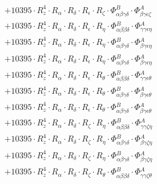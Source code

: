 \documentclass{article}
\begin{document}
\begin{subequations}
\begin{gather}
\begin{array}{c}
 \\[0.2em] 		 + 10395 \cdot R_{z}^{4} \cdot R_{\alpha{}} \cdot R_{\delta{}} \cdot R_{\epsilon{}} \cdot R_{\zeta{}} \cdot \Phi{}^{B}_{\alpha{}\beta{}\gamma{}\delta{}} \cdot \Phi{}^{A}_{\beta{}\gamma{}\epsilon{}\zeta{}} 
 \\[0.2em] 		 + 10395 \cdot R_{z}^{4} \cdot R_{\alpha{}} \cdot R_{\delta{}} \cdot R_{\epsilon{}} \cdot R_{\eta{}} \cdot \Phi{}^{B}_{\alpha{}\beta{}\beta{}\delta{}} \cdot \Phi{}^{A}_{\gamma{}\gamma{}\epsilon{}\eta{}} 
 \\[0.2em] 		 + 10395 \cdot R_{z}^{4} \cdot R_{\alpha{}} \cdot R_{\delta{}} \cdot R_{\epsilon{}} \cdot R_{\eta{}} \cdot \Phi{}^{B}_{\alpha{}\beta{}\gamma{}\delta{}} \cdot \Phi{}^{A}_{\beta{}\gamma{}\epsilon{}\eta{}} 
 \\[0.2em] 		 + 10395 \cdot R_{z}^{4} \cdot R_{\alpha{}} \cdot R_{\delta{}} \cdot R_{\epsilon{}} \cdot R_{\eta{}} \cdot \Phi{}^{B}_{\alpha{}\beta{}\gamma{}\delta{}} \cdot \Phi{}^{A}_{\beta{}\gamma{}\epsilon{}\eta{}} 
 \\[0.2em] 		 + 10395 \cdot R_{z}^{4} \cdot R_{\alpha{}} \cdot R_{\delta{}} \cdot R_{\epsilon{}} \cdot R_{\theta{}} \cdot \Phi{}^{B}_{\alpha{}\beta{}\beta{}\delta{}} \cdot \Phi{}^{A}_{\gamma{}\gamma{}\epsilon{}\theta{}} 
 \\[0.2em] 		 + 10395 \cdot R_{z}^{4} \cdot R_{\alpha{}} \cdot R_{\delta{}} \cdot R_{\epsilon{}} \cdot R_{\theta{}} \cdot \Phi{}^{B}_{\alpha{}\beta{}\gamma{}\delta{}} \cdot \Phi{}^{A}_{\beta{}\gamma{}\epsilon{}\theta{}} 
 \\[0.2em] 		 + 10395 \cdot R_{z}^{4} \cdot R_{\alpha{}} \cdot R_{\delta{}} \cdot R_{\epsilon{}} \cdot R_{\theta{}} \cdot \Phi{}^{B}_{\alpha{}\beta{}\gamma{}\delta{}} \cdot \Phi{}^{A}_{\beta{}\gamma{}\epsilon{}\theta{}} 
 \\[0.2em] 		 + 10395 \cdot R_{z}^{4} \cdot R_{\alpha{}} \cdot R_{\delta{}} \cdot R_{\zeta{}} \cdot R_{\eta{}} \cdot \Phi{}^{B}_{\alpha{}\beta{}\beta{}\delta{}} \cdot \Phi{}^{A}_{\gamma{}\gamma{}\zeta{}\eta{}} 
 \\[0.2em] 		 + 10395 \cdot R_{z}^{4} \cdot R_{\alpha{}} \cdot R_{\delta{}} \cdot R_{\zeta{}} \cdot R_{\eta{}} \cdot \Phi{}^{B}_{\alpha{}\beta{}\gamma{}\delta{}} \cdot \Phi{}^{A}_{\beta{}\gamma{}\zeta{}\eta{}} 
 \\[0.2em] 		 + 10395 \cdot R_{z}^{4} \cdot R_{\alpha{}} \cdot R_{\delta{}} \cdot R_{\zeta{}} \cdot R_{\eta{}} \cdot \Phi{}^{B}_{\alpha{}\beta{}\gamma{}\delta{}} \cdot \Phi{}^{A}_{\beta{}\gamma{}\zeta{}\eta{}} 
 \\[0.2em] 		 + 10395 \cdot R_{z}^{4} \cdot R_{\alpha{}} \cdot R_{\delta{}} \cdot R_{\zeta{}} \cdot R_{\theta{}} \cdot \Phi{}^{B}_{\alpha{}\beta{}\beta{}\delta{}} \cdot \Phi{}^{A}_{\gamma{}\gamma{}\zeta{}\theta{}} 

\end{array}
\end{gather}
\end{subequations}
\end{document}
